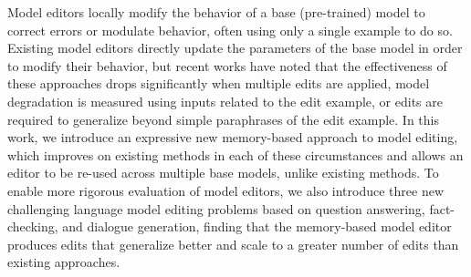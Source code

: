 Model editors locally modify the behavior of a base (pre-trained) model to correct errors or modulate behavior, often using only a single example to do so. 
Existing model editors directly update the parameters of the base model in order to modify their behavior, but recent works have noted that the effectiveness of these approaches drops significantly when multiple edits are applied, model degradation is measured using inputs related to the edit example,
or edits are required to generalize beyond simple paraphrases of the edit example. In this work, we introduce an expressive new memory-based approach to model editing, which improves on existing methods in each of these circumstances and allows an editor to be re-used across multiple base models, unlike existing methods. 
To enable more rigorous evaluation of model editors, we also introduce three new challenging language model editing problems based on question answering, fact-checking, and dialogue generation, finding that the memory-based model editor produces edits that generalize better and scale to a greater number of edits than existing approaches.

